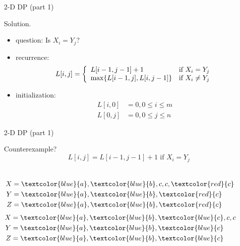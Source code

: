 \begin{frame}{2-D DP (part 1)}
  \begin{block}{Solution.}
    \begin{itemize}
      \item question: Is $X_{i} = Y_{j}$?
      \item recurrence:
	\begin{displaymath}
	  L[i,j] = \left\{ \begin{array}{ll}
	    L[i-1, j-1] + 1 & \textrm{if $X_{i} = Y_{j}$}\\
	    \max \{L[i-1,j], L[i,j-1]\} & \textrm{if $X_{i} \neq Y_{j}$}
	  \end{array} \right.
	\end{displaymath}
      \item<2-> initialization:
	\begin{align*}
	  L[i,0] &= 0, 0 \le i \le m \\
	  L[0,j] &= 0, 0 \le j \le n
	\end{align*}
    \end{itemize}
  \end{block}

\end{frame}
\begin{frame}{2-D DP (part 1)}
  \begin{alertblock}{Counterexample?}
    \[
      L[i,j] = L[i-1,j-1] + 1 \text{ if } X_{i} = Y_{j}
    \]

    \begin{columns}
	\begin{align*}
	  X &= \textcolor{blue}{a},\textcolor{blue}{b},c,c,\textcolor{red}{c} \\
	  Y &= \textcolor{blue}{a},\textcolor{blue}{b},\textcolor{red}{c}  \\
	  Z &= \textcolor{blue}{a},\textcolor{blue}{b},\textcolor{red}{c}
	\end{align*}
	\begin{align*}
	  X &= \textcolor{blue}{a},\textcolor{blue}{b},\textcolor{blue}{c},c,c \\
	  Y &= \textcolor{blue}{a},\textcolor{blue}{b},\textcolor{blue}{c}  \\
	  Z &= \textcolor{blue}{a},\textcolor{blue}{b},\textcolor{blue}{c}
	\end{align*}
    \end{columns}
  \end{alertblock}
\end{frame}
